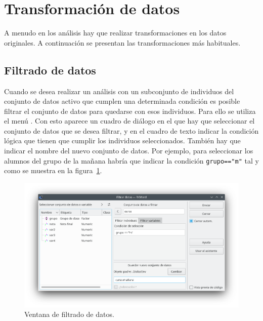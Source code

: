 \section{Transformación de datos}
A menudo en los análisis hay que realizar transformaciones en los datos originales.
A continuación se presentan las transformaciones más habituales.


\subsection{Filtrado de datos}
Cuando se desea realizar un análisis con un subconjunto de individuos del conjunto de datos activo que cumplen una
determinada condición es posible filtrar el conjunto de datos para quedarse con esos individuos.
Para ello se utiliza el menú .
Con esto aparece un cuadro de diálogo en el que hay que seleccionar el conjunto de datos que se desea filtrar, y en el
cuadro de texto  indicar la condición lógica que tienen que cumplir los individuos
seleccionados.
También hay que indicar el nombre del nuevo conjunto de datos.
Por ejemplo, para seleccionar los alumnos del grupo de la mañana habría que indicar la condición
\lstinline{grupo=="m"} tal y como se muestra en la figura~\ref{g:filtrar_datos}.

\begin{figure}[htp]
\begin{center}
  \includegraphics[scale=0.6]{capitulos/introduccion/img/filtrar}
  \caption{Ventana de filtrado de datos.}
  \label{g:filtrar_datos}
\end{center}
\end{figure}



